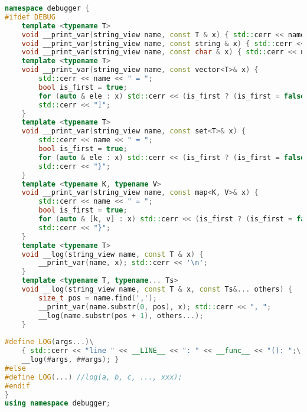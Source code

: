 \begin{lstlisting}[language=C++]
namespace debugger {
#ifdef DEBUG
    template <typename T>
    void __print_var(string_view name, const T & x) { std::cerr << name << " = " << x; }
    void __print_var(string_view name, const string & x) { std::cerr << name << " = \"" << x << "\""; }
    void __print_var(string_view name, const char & x) { std::cerr << name << " = \'" << x << "\'"; }
    template <typename T>
    void __print_var(string_view name, const vector<T>& x) {
        std::cerr << name << " = ";
        bool is_first = true;
        for (auto & ele : x) std::cerr << (is_first ? (is_first = false, "[") : ", ") << ele;
        std::cerr << "]";
    }
    template <typename T>
    void __print_var(string_view name, const set<T>& x) {
        std::cerr << name << " = ";
        bool is_first = true;
        for (auto & ele : x) std::cerr << (is_first ? (is_first = false, "{") : ", ") << ele;
        std::cerr << "}";
    }
    template <typename K, typename V>
    void __print_var(string_view name, const map<K, V>& x) {
        std::cerr << name << " = ";
        bool is_first = true;
        for (auto & [k, v] : x) std::cerr << (is_first ? (is_first = false, "{") : ", ") << "(" << k << ": " << v << ")";
        std::cerr << "}";
    }
    template <typename T>
    void __log(string_view name, const T & x) {
        __print_var(name, x); std::cerr << '\n';
    }
    template <typename T, typename... Ts>
    void __log(string_view name, const T & x, const Ts&... others) {
        size_t pos = name.find(',');
        __print_var(name.substr(0, pos), x); std::cerr << ", ";
        __log(name.substr(pos + 1), others...);
    }
 
#define LOG(args...)\
    { std::cerr << "line " << __LINE__ << ": " << __func__ << "(): ";\
    __log(#args, ##args); }
#else
#define LOG(...) //log(a, b, c, ..., xxx);
#endif
}
using namespace debugger;
\end{lstlisting}
